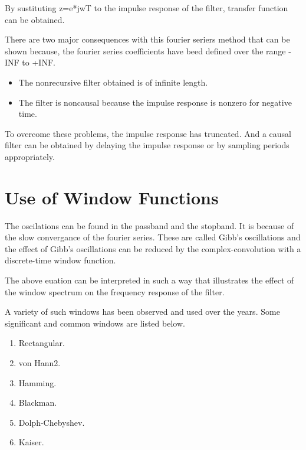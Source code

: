 \documentclass[twoside,12pt,times,onecolumn,a4paper]{report}
\begin{document}
By sustituting z=e*jwT to the impulse response of the filter, transfer function can be obtained.


There are two major consequences with this fourier seriers method that can be shown because, the fourier series coefficients have beed defined over the range -INF to +INF.
\begin{itemize}
  \item The nonrecursive filter obtained is of infinite length.
  \item The filter is noncausal because the impulse response is nonzero for negative time.
\end{itemize}

To overcome these problems, the impulse response has truncated. And a causal filter can be obtained by delaying the impulse response or by sampling periods appropriately.



\section{Use of Window Functions}
\hspace{4em}The oscilations can be found in the passband and the stopband. It is because of the slow convergance of the fourier series. These are called Gibb's oscillations and the effect of Gibb's oscillations\cite{dspdeer} can be reduced by the complex-convolution with a discrete-time window function. 



The above euation can be interpreted in such a way that illustrates the effect of the window spectrum on the frequency response of the filter.


A variety of such windows has been observed and used over the years. Some significant and common windows are listed below.

\begin{enumerate}
  \item Rectangular.
  \item von Hann2.
  \item Hamming.
  \item Blackman.
  \item Dolph-Chebyshev.
  \item Kaiser.
\end{enumerate}
\end{document}
